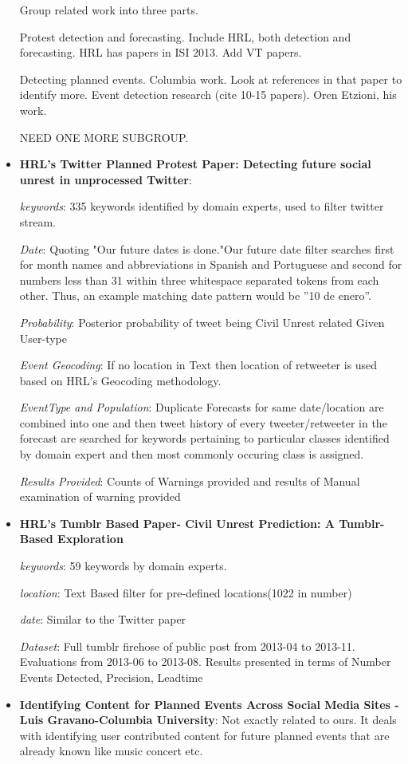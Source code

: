 \begin{itemize}

Group related work into three parts.

Protest detection and forecasting. Include HRL, both detection and 
forecasting. HRL has papers in ISI 2013. Add VT papers.

Detecting planned events. Columbia work. Look at references in that
paper to identify more. Event detection research (cite 10-15 papers).
Oren Etzioni, his work.

NEED ONE MORE SUBGROUP.

    \item
        \textbf{HRL's Twitter Planned Protest Paper: Detecting future social unrest in unprocessed Twitter}: 

        {\em keywords}: 335 keywords identified by domain experts, used to filter twitter stream.

        {\em Date}: Quoting "Our future dates is done."Our future date filter searches first for month names and abbreviations in Spanish and Portuguese and second for numbers less than 31 within three whitespace separated tokens from each other. Thus, an example matching date pattern would be ”10 de enero”.


        {\em Probability}: Posterior probability of tweet being Civil Unrest related Given User-type

        {\em Event Geocoding}: If no location in Text then location of retweeter is used based on HRL's Geocoding methodology.

        {\em EventType and Population}: Duplicate Forecasts for same date/location are combined into one and then tweet history of every tweeter/retweeter in the forecast are searched for keywords pertaining to particular classes identified by domain expert and then most commonly occuring class is assigned.
        
        {\em Results Provided}: Counts of Warnings provided and results of Manual examination of warning provided

    \item \textbf{HRL's Tumblr Based Paper- Civil Unrest Prediction: A Tumblr-Based Exploration}

        {\em keywords}: 59 keywords by domain experts.

        {\em location}: Text Based filter for pre-defined locations(1022 in number)

        {\em date}: Similar to the Twitter paper

        {\em Dataset}: Full tumblr firehose of public post from 2013-04 to 2013-11. Evaluations from 2013-06 to 2013-08. Results presented in terms of Number Events Detected, Precision, Leadtime

    \item \textbf{Identifying Content for Planned Events Across Social Media Sites - Luis Gravano-Columbia University}:
            Not exactly related to ours. It deals with identifying user contributed content for future planned events that are already known like music concert etc.

\end{itemize}
